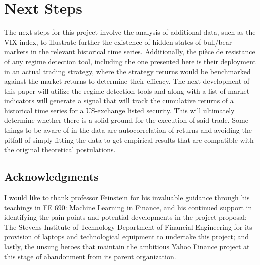 \documentclass[]{hdsr}
\begin{document}
\section{Next Steps}
\label{sec5}
The next steps for this project involve the analysis of additional data, such as the VIX index, to illustrate further the existence of hidden states of bull/bear markets in the relevant historical time series. Additionally, the pièce de resistance of any regime detection tool, including the one presented here is their deployment in an actual trading strategy, where the strategy returns would be benchmarked against the market returns to determine their efficacy. The next development of this paper will utilize the regime detection tools and along with a list of market indicators will generate a signal that will track the cumulative returns of a historical time series for a US-exchange listed security. This will ultimately determine whether there is a solid ground for the execution of said trade. Some things to be aware of in the data are autocorrelation of returns and avoiding the pitfall of simply fitting the data to get empirical results that are compatible with the original theoretical postulations.

\subsection*{Acknowledgments}
I would like to thank professor Feinstein for his invaluable guidance through his teachings in FE 690: Machine Learning in Finance, and his continued support in identifying the pain points and potential developments in the project proposal; The Stevens Institute of Technology Department of Financial Engineering for its provision of laptops and technological equipment to undertake this project; and lastly, the unsung heroes that maintain the ambitious Yahoo Finance project at this stage of abandonment from its parent organization.

\appendix
\end{document}
